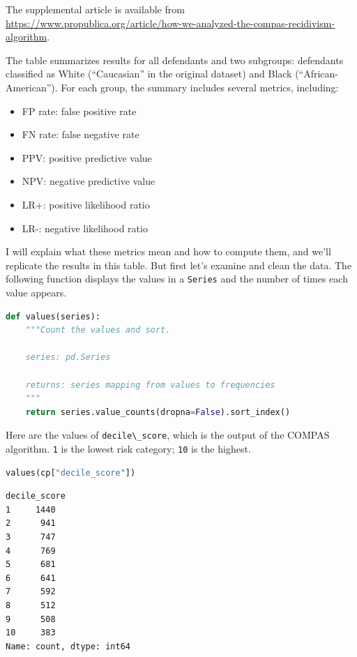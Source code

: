 The supplemental article is available from
\url{https://www.propublica.org/article/how-we-analyzed-the-compas-recidivism-algorithm}.

The table summarizes results for all defendants and two subgroups:
defendants classified as White (``Caucasian'' in the original dataset)
and Black (``African-American''). For each group, the summary includes
several metrics, including:

\begin{itemize}

\item
  FP rate: false positive rate
\item
  FN rate: false negative rate
\item
  PPV: positive predictive value
\item
  NPV: negative predictive value
\item
  LR+: positive likelihood ratio
\item
  LR-: negative likelihood ratio
\end{itemize}

I will explain what these metrics mean and how to compute them, and
we'll replicate the results in this table. But first let's examine and
clean the data. The following function displays the values in a
\passthrough{\lstinline!Series!} and the number of times each value
appears.

\begin{lstlisting}[language=Python,style=source]
def values(series):
    """Count the values and sort.

    series: pd.Series

    returns: series mapping from values to frequencies
    """
    return series.value_counts(dropna=False).sort_index()
\end{lstlisting}

Here are the values of \passthrough{\lstinline!decile\_score!}, which is
the output of the COMPAS algorithm. \passthrough{\lstinline!1!} is the
lowest risk category; \passthrough{\lstinline!10!} is the highest.

\begin{lstlisting}[language=Python,style=source]
values(cp["decile_score"])
\end{lstlisting}

\begin{lstlisting}[style=output]
decile_score
1     1440
2      941
3      747
4      769
5      681
6      641
7      592
8      512
9      508
10     383
Name: count, dtype: int64
\end{lstlisting}

